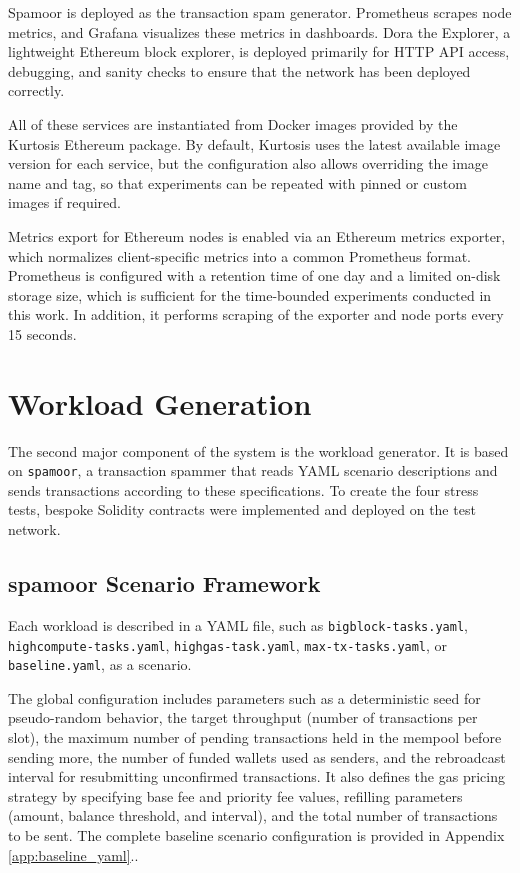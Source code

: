 Spamoor is deployed as the transaction spam generator. Prometheus scrapes node metrics, and Grafana visualizes these metrics in dashboards. Dora the Explorer, a lightweight Ethereum block explorer, is deployed primarily for HTTP API access, debugging, and sanity checks to ensure that the network has been deployed correctly.

All of these services are instantiated from Docker images provided by the Kurtosis Ethereum package. By default, Kurtosis uses the latest available image version for each service, but the configuration also allows overriding the image name and tag, so that experiments can be repeated with pinned or custom images if required.

Metrics export for Ethereum nodes is enabled via an Ethereum metrics exporter, which normalizes client-specific metrics into a common Prometheus format. Prometheus is configured with a retention time of one day and a limited on-disk storage size, which is sufficient for the time-bounded experiments conducted in this work. In addition, it performs scraping of the exporter and node ports every 15 seconds.


\section{Workload Generation}
The second major component of the system is the workload generator. It is based on \texttt{spamoor}, a transaction spammer that reads YAML scenario descriptions and sends transactions according to these specifications. To create the four stress tests, bespoke Solidity contracts were implemented and deployed on the test network.

\subsection{spamoor Scenario Framework}

Each workload is described in a YAML file, such as \texttt{bigblock-tasks.yaml}, \texttt{highcompute-tasks.yaml}, \texttt{highgas-task.yaml}, \texttt{max-tx-tasks.yaml}, or \texttt{baseline.yaml}, as a scenario.

The global configuration includes parameters such as a deterministic seed for pseudo-random behavior, the target throughput (number of transactions per slot), the maximum number of pending transactions held in the mempool before sending more, the number of funded wallets used as senders, and the rebroadcast interval for resubmitting unconfirmed transactions. It also defines the gas pricing strategy by specifying base fee and priority fee values, refilling parameters (amount, balance threshold, and interval), and the total number of transactions to be sent. The complete baseline scenario configuration is provided in Appendix \ref{app:baseline_yaml}..

